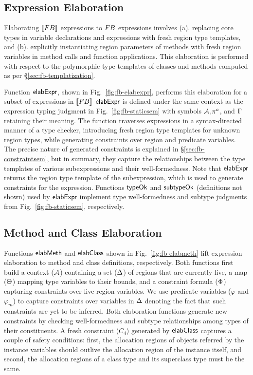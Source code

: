 


\subsection{Expression Elaboration}

Elaborating $\llbracket {\sc FB} \rrbracket$ expressions to ${\sc FB}$ expressions involves
(a). replacing core types in variable declarations and 
expressions with fresh region type templates, and (b). explicitly
instantiating region parameters of methods with fresh region variables
in method calls and function applications. This elaboration is
performed with respect to the polymorphic type templates of classes
and methods computed as per \S\ref{sec:fb-templatization}. 

Function ${\sf elabExpr}$, shown in Fig.~\ref{fig:fb-elabexpr}, performs
this elaboration for a subset of expressions in $\llbracket {\sc FB} \rrbracket$
${\sf elabExpr}$ is defined under the same context as the expression typing
judgment in Fig.~\ref{fig:fb-staticsem} with symbols ${\mathcal{A}}$,$\pi^a$,
and $\Gamma$ retaining their meaning. The function traverses expressions
in a syntax-directed manner of a type checker, introducing fresh
region type templates for unknown region types, while generating
constraints over region and predicate variables. The precise nature of
generated constraints is explained in \S\ref{sec:fb-constraintsem},
but in summary, they capture the relationships between the type
templates of various subexpressions and their well-formedness. Note
that ${\sf elabExpr}$ returns the region type template of the
subexpression, which is used to generate constraints for the
expression. Functions ${\sf typeOk}$ and ${\sf subtypeOk}$ (definitions not
shown) used by ${\sf elabExpr}$ implement type well-formedness and subtype
judgments from Fig.~\ref{fig:fb-staticsem}, respectively.

\subsection{Method and Class Elaboration}

Functions ${\sf elabMeth}$ and ${\sf elabClass}$ shown in
Fig.~\ref{fig:fb-elabmeth} lift expression elaboration to method and
class definitions, respectively. Both functions first build a context
(${\mathcal{A}}$) containing a set ($ \Delta$) of regions that are currently
live, a map ($\Theta$) mapping type variables to their bounds, and a
constraint formula ($\Phi$) capturing constraints over live region
variables. We use predicate variables ($\varphi$ and $\varphi_m$) to
capture constraints over variables in $\Delta$ denoting the fact that
such constraints are yet to be inferred. Both elaboration functions
generate new constraints by checking well-formedness and subtype
relationships among types of their constituents. A fresh constraint
($C_4$) generated by ${\sf elabClass}$ captures a couple of safety
conditions: first, the allocation regions of objects referred by the
instance variables should outlive the allocation region of the
instance itself, and second, the allocation regions of a class type
and its superclass type must be the same.

